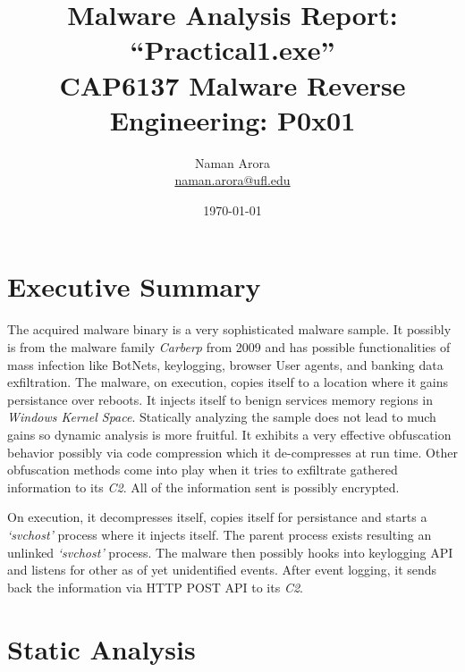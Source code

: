 \documentclass[10pt,a4paper]{article}
\begin{document}

\title{Malware Analysis Report: ``Practical1.exe''\\ \vspace{-8pt} {\large CAP6137 Malware Reverse Engineering: P0x01}}
\author{{Naman Arora \\ \vspace{-10pt}\small \href{mailto:naman.arora@ufl.edu}{naman.arora@ufl.edu}}}
\date{\today}

\maketitle
\newpage
\tableofcontents
\newpage
\section{Executive Summary}
The acquired malware binary is a very sophisticated malware sample. It possibly is from the malware family \textit{Carberp} from 2009 and has possible functionalities of mass infection like BotNets, keylogging, browser User agents, and banking data exfiltration. The malware, on execution, copies itself to a location where it gains persistance over reboots. It injects itself to benign services memory regions in \textit{Windows Kernel Space}. Statically analyzing the sample does not lead to much gains so dynamic analysis is more fruitful. It exhibits a very effective obfuscation behavior possibly via code compression which it de-compresses at run time. Other obfuscation methods come into play when it tries to exfiltrate gathered information to its \textit{C2}. All of the information sent is possibly encrypted.

On execution, it decompresses itself, copies itself for persistance and starts a \textit{`svchost'} process where it injects itself. The parent process exists resulting an unlinked \textit{`svchost'} process. The malware then possibly hooks into keylogging API and listens for other as of yet unidentified events. After event logging, it sends back the information via HTTP POST API to its \textit{C2}.

\section{Static Analysis}
\end{document}
